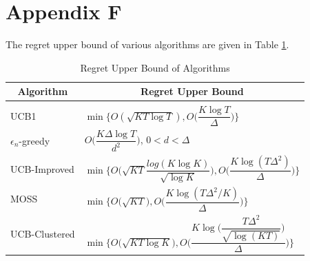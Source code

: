 \section{Appendix F}
\label{App:F}
The regret upper bound of various algorithms are given in Table \ref{sample-table}.
\begin{table}
\caption{Regret Upper Bound of Algorithms}
\label{sample-table}
\begin{center}
\begin{tabular}{l|l}
\multicolumn{1}{c}{\bf Algorithm}  &\multicolumn{1}{c}{\bf Regret Upper Bound} \\
\hline \\
UCB1         &\hspace*{5em}$\min\bigg\lbrace O(\sqrt{KT\log T}) ,O\bigg(\dfrac{K\log T}{\Delta}\bigg)\bigg\rbrace$ \\
$\epsilon_{n}$-greedy         &\hspace*{5em}$O\bigg(\dfrac{K\Delta\log T}{d^{2}}\bigg)$, $0<d<\Delta$ \\
UCB-Improved             &\hspace*{5em}$\min\bigg\lbrace O\bigg(\sqrt{KT}\dfrac{log(K\log K)}{\sqrt{\log K}}\bigg), O\bigg(\dfrac{K\log (T\Delta^{2})}{\Delta}\bigg)\bigg\rbrace$ \\
MOSS				&\hspace*{5em}$\min\bigg\lbrace O\bigg(\sqrt{KT}\bigg), O\bigg(\dfrac{K\log(T\Delta^{2}/K)}{\Delta}\bigg) \bigg \rbrace$\\
UCB-Clustered             &\hspace*{5em}$\min\bigg\lbrace O\bigg(\sqrt{KT\log K}\bigg),O\bigg(\dfrac{K\log\big (\dfrac{T\Delta^{2}}{\sqrt{\log (KT)}}\big)}{\Delta}\bigg)\bigg\rbrace$\\

\end{tabular}
\end{center}
\end{table}
